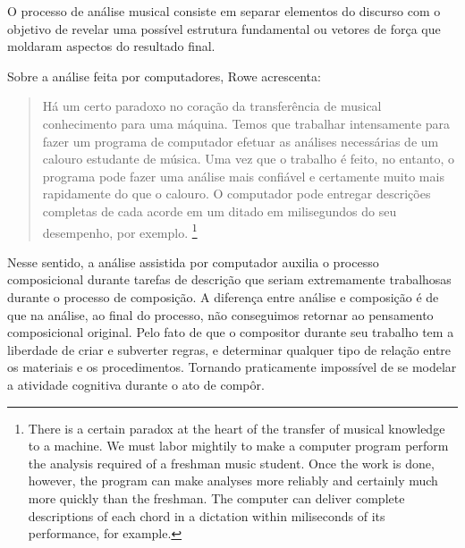 \documentclass[draft]{ppgmus}
\begin{document}

O processo de análise musical consiste em separar elementos
do discurso com o objetivo de revelar uma possível estrutura fundamental
ou vetores de força que moldaram aspectos do resultado final.

Sobre a análise feita por computadores, Rowe acrescenta:

\begin{quote}
Há um certo paradoxo no coração da 
transferência de musical
conhecimento para uma máquina. Temos que trabalhar intensamente para fazer um programa de computador
efetuar as análises necessárias de um calouro estudante de música.
Uma vez que o trabalho é feito, no entanto, o programa pode fazer uma análise mais confiável
e certamente muito mais rapidamente do que o calouro. O computador pode entregar
descrições completas de cada acorde em um ditado em milisegundos
do seu desempenho, por exemplo. \cite{rowe2004machine}
\footnote{There is a certain paradox at the heart of the transfer of musical
knowledge to a machine. We must labor mightily to make a computer
program perform the analysis required of a freshman music student.
Once the work is done, however, the program can make analyses more reliably
and certainly much more quickly than the freshman. The computer can deliver 
complete descriptions of each chord in a dictation within miliseconds
of its performance, for example.}
\end{quote}


Nesse sentido, a análise assistida por computador auxilia
o processo composicional durante tarefas de descrição que seriam
extremamente trabalhosas durante o processo de composição.
A diferença entre análise e composição é de que na análise, ao final do
processo, não conseguimos retornar ao pensamento composicional
original. Pelo fato de que o compositor durante seu trabalho tem a 
liberdade de criar e subverter regras, e determinar qualquer tipo de relação
entre os materiais e os procedimentos. Tornando praticamente impossível
de se modelar a atividade cognitiva durante o ato de compôr.
\end{document}
